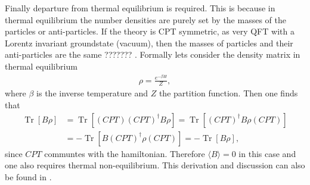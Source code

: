 \documentclass[13pt,a4paper,twoside,titlepage]{article}
\newcommand{\Tr}{\operatorname{Tr}}
\begin{document}
Finally departure from thermal equilibrium is required. This is because in thermal equilibrium the number densities are purely set by the
masses of the particles or anti-particles. If the theory is CPT symmetric, as very QFT with a Lorentz invariant groundstate (vacuum), then the
masses of particles and their anti-particles are the same ??????? .
Formally lets consider the density matrix in thermal equilibrium
\begin{align}
    \rho = \frac{e^{- \beta H}}{Z},
\end{align}
where $\beta$ is the inverse temperature and $Z$ the partition function.
Then one finds that
\begin{align}
    \Tr [ B \rho ] &=  \Tr [ (CPT) (CPT)^\dagger B \rho ] = \Tr [ (CPT)^\dagger B \rho (CPT) ]  \\
                   &= - \Tr [ B (CPT)^\dagger \rho (CPT) ] = - \Tr [ B \rho ],
\end{align}
since $CPT$ communtes with the hamiltonian. Therefore $\langle B \rangle = 0$ in this case and one also requires thermal non-equilibrium. This derivation and discussion can also be found in \cite[sec. II]{Trodden:2004mj_baryogenesis_and_leptogenesis}.
\end{document}

